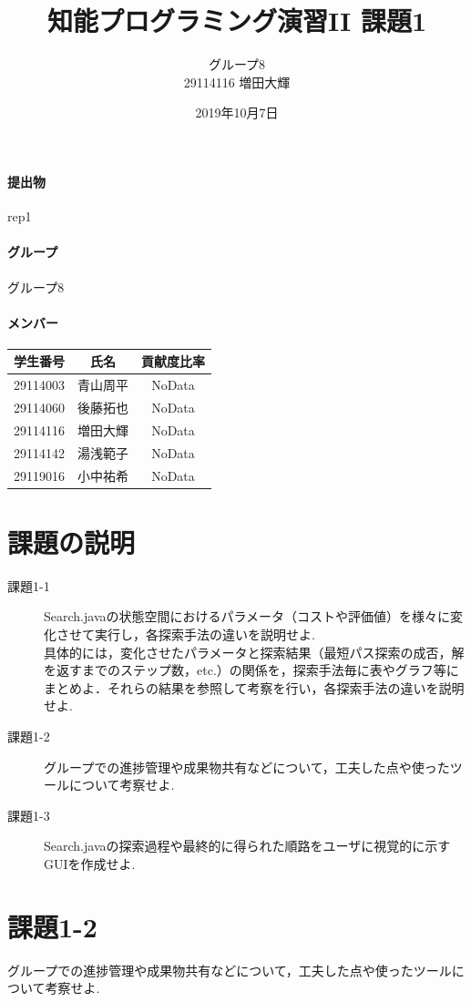 ﻿\documentclass[uplatex,12pt]{jsarticle}
\title{知能プログラミング演習II 課題1}
\author{グループ8\\
  29114116 増田大輝\\
}
\date{2019年10月7日}
\begin{document}
\maketitle

\paragraph{提出物} rep1
\paragraph{グループ} グループ8

\paragraph{メンバー}
\begin{tabular}{|c|c|c|}
  \hline
  学生番号&氏名&貢献度比率\\
  \hline\hline
  29114003&青山周平&NoData\\
  \hline
  29114060&後藤拓也&NoData\\
  \hline
  29114116&増田大輝&NoData\\
  \hline
  29114142&湯浅範子&NoData\\
  \hline
  29119016&小中祐希&NoData\\
  \hline
\end{tabular}



\section{課題の説明}
\begin{description}
\item[課題1-1] Search.javaの状態空間におけるパラメータ（コストや評価値）を様々に変化させて実行し，各探索手法の違いを説明せよ. \\
具体的には，変化させたパラメータと探索結果（最短パス探索の成否，解を返すまでのステップ数，etc.）の関係を，探索手法毎に表やグラフ等にまとめよ．それらの結果を参照して考察を行い，各探索手法の違いを説明せよ. \\
\item[課題1-2] グループでの進捗管理や成果物共有などについて，工夫した点や使ったツールについて考察せよ.
\item[課題1-3] Search.javaの探索過程や最終的に得られた順路をユーザに視覚的に示すGUIを作成せよ. 
\end{description}

\section{課題1-2}
\begin{screen}
  グループでの進捗管理や成果物共有などについて，工夫した点や使ったツールについて考察せよ.
\end{screen}
\end{document}
